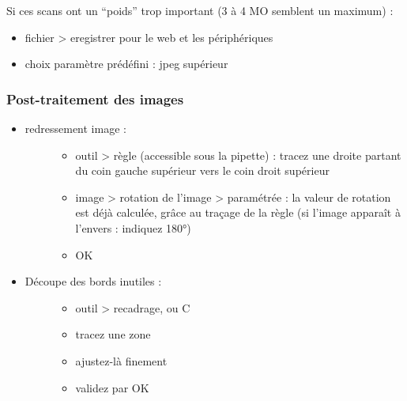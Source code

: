 \documentclass[a4paper,12pt,french]{sphinxmanual}
\begin{document}
Si ces scans ont un ``poids'' trop important (3 à 4 MO semblent un maximum) :
\begin{itemize}
\item {} 
fichier \textgreater{} eregistrer pour le web et les périphériques

\item {} 
choix paramètre prédéfini : jpeg supérieur

\end{itemize}


\subsubsection{Post-traitement des images}
\label{psd/scan+assemblage_psd+gimp+autopano:post-traitement-des-images}\begin{itemize}
\item {} \begin{description}
\item[{redressement image :}] \leavevmode\begin{itemize}
\item {} 
outil \textgreater{} règle (accessible sous la pipette) : tracez une droite partant du coin gauche supérieur vers le coin droit supérieur

\item {} 
image \textgreater{} rotation de l'image \textgreater{} paramétrée : la valeur de rotation est déjà calculée, grâce au traçage de la règle (si l'image apparaît à l'envers : indiquez 180°)

\item {} 
OK

\end{itemize}

\end{description}

\item {} \begin{description}
\item[{Découpe des bords inutiles :}] \leavevmode\begin{itemize}
\item {} 
outil \textgreater{} recadrage, ou C

\item {} 
tracez une zone

\item {} 
ajustez-là finement

\item {} 
validez par OK


\end{itemize}
\end{description}
\end{itemize}
\end{document}
